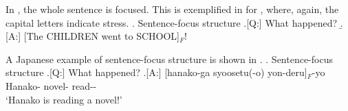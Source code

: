 %
%
%


In ,
the whole sentence is focused.
This is exemplified in \Next[A] for ,
where, again, the capital letters indicate stress.
\ex. Sentence-focus structure
	\a.[Q:] What happened?
	\b.[A:] [The CHILDREN went to SCHOOL]$_{F}$!
	\hfill{\cite[][p.\ 121]{lambrecht94}}

A Japanese example of sentence-focus structure is shown in \Next[A].
\ex. Sentence-focus structure
	\a.[Q:] What happened? 
	\bg.[A:] [hanako-ga syoosetu(-o) yon-deru]$_{F}$-yo \\
		Hanako- novel- read-- \\
		`Hanako is reading a novel!'

